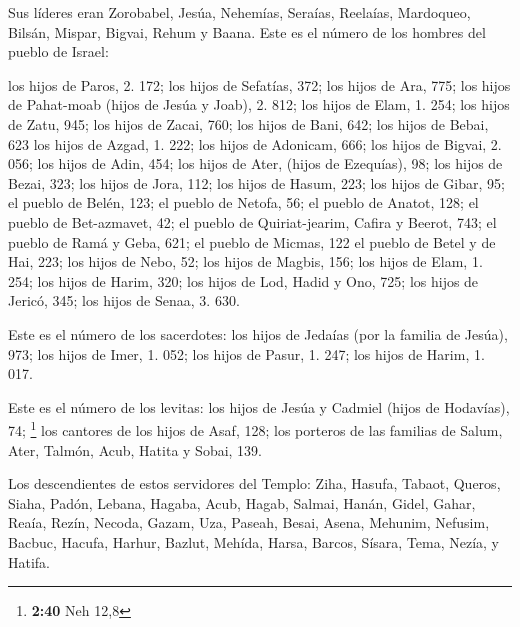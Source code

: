 Sus líderes eran Zorobabel, Jesúa, Nehemías, Seraías,
Reelaías, Mardoqueo, Bilsán, Mispar, Bigvai, Rehum y Baana. Este es el
número de los hombres del pueblo de Israel:

 los hijos de Paros, 2. 172;  los hijos de
Sefatías, 372;  los hijos de Ara, 775;  los
hijos de Pahat-moab (hijos de Jesúa y Joab), 2. 812;  los
hijos de Elam, 1. 254;  los hijos de Zatu, 945;
 los hijos de Zacai, 760;  los hijos de
Bani, 642;  los hijos de Bebai, 623  los
hijos de Azgad, 1. 222;  los hijos de Adonicam, 666;
 los hijos de Bigvai, 2. 056;  los hijos
de Adin, 454;  los hijos de Ater, (hijos de Ezequías),
98;  los hijos de Bezai, 323;  los hijos
de Jora, 112;  los hijos de Hasum, 223; 
los hijos de Gibar, 95;  el pueblo de Belén, 123;
 el pueblo de Netofa, 56;  el pueblo de
Anatot, 128;  el pueblo de Bet-azmavet, 42;
 el pueblo de Quiriat-jearim, Cafira y Beerot, 743;
 el pueblo de Ramá y Geba, 621;  el pueblo
de Micmas, 122  el pueblo de Betel y de Hai, 223;
 los hijos de Nebo, 52;  los hijos de
Magbis, 156;  los hijos de Elam, 1. 254; 
los hijos de Harim, 320;  los hijos de Lod, Hadid y Ono,
725;  los hijos de Jericó, 345;  los hijos
de Senaa, 3. 630.

 Este es el número de los sacerdotes: los hijos de
Jedaías (por la familia de Jesúa), 973;  los hijos de
Imer, 1. 052;  los hijos de Pasur, 1. 247;
 los hijos de Harim, 1. 017.

 Este es el número de los levitas: los hijos de Jesúa y
Cadmiel (hijos de Hodavías), 74; \footnote{\textbf{2:40} Neh 12,8}
 los cantores de los hijos de Asaf, 128; 
los porteros de las familias de Salum, Ater, Talmón, Acub, Hatita y
Sobai, 139.

 Los descendientes de estos servidores del Templo: Ziha,
Hasufa, Tabaot,  Queros, Siaha, Padón, 
Lebana, Hagaba, Acub,  Hagab, Salmai, Hanán,
 Gidel, Gahar, Reaía,  Rezín, Necoda,
Gazam,  Uza, Paseah, Besai,  Asena,
Mehunim, Nefusim,  Bacbuc, Hacufa, Harhur,
 Bazlut, Mehída, Harsa,  Barcos, Sísara,
Tema,  Nezía, y Hatifa.

